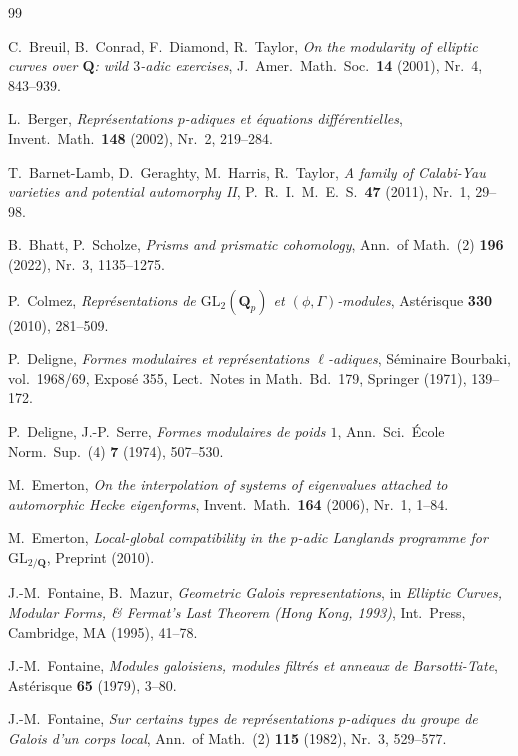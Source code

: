 \documentclass[12pt,a4paper]{amsart}
\theoremstyle{definition}
\theoremstyle{remark}
\begin{document}
\begin{thebibliography}{99}

C.\ Breuil, B.\ Conrad, F.\ Diamond, R.\ Taylor,
\textit{On the modularity of elliptic curves over $\mathbf{Q}$: wild $3$-adic exercises},
J.\ Amer.\ Math.\ Soc.\ \textbf{14} (2001), Nr.\ 4, 843--939.

L.\ Berger,
\textit{Représentations $p$-adiques et équations différentielles},
Invent.\ Math.\ \textbf{148} (2002), Nr.\ 2, 219--284.

T.\ Barnet-Lamb, D.\ Geraghty, M.\ Harris, R.\ Taylor,
\textit{A family of Calabi-Yau varieties and potential automorphy II},
P.\ R.\ I.\ M.\ E.\ S.\ \textbf{47} (2011), Nr.\ 1, 29--98.

B.\ Bhatt, P.\ Scholze,
\textit{Prisms and prismatic cohomology},
Ann.\ of Math.\ (2) \textbf{196} (2022), Nr.\ 3, 1135--1275.

P.\ Colmez,
\textit{Représentations de $\mathrm{GL}_2(\mathbf{Q}_p)$ et $(\phi, \Gamma)$-modules},
Astérisque \textbf{330} (2010), 281--509.

P.\ Deligne,
\textit{Formes modulaires et représentations $\ell$-adiques},
Séminaire Bourbaki, vol.\ 1968/69, Exposé 355, Lect.\ Notes in Math.\ Bd.\ 179,
Springer (1971), 139--172.

P.\ Deligne, J.-P.\ Serre,
\textit{Formes modulaires de poids $1$},
Ann.\ Sci.\ École Norm.\ Sup.\ (4) \textbf{7} (1974), 507--530.

M.\ Emerton,
\textit{On the interpolation of systems of eigenvalues attached to automorphic Hecke eigenforms},
Invent.\ Math.\ \textbf{164} (2006), Nr.\ 1, 1--84.

M.\ Emerton,
\textit{Local-global compatibility in the $p$-adic Langlands programme for $\mathrm{GL}_{2/\mathbf{Q}}$},
Preprint (2010).

J.-M.\ Fontaine, B.\ Mazur,
\textit{Geometric Galois representations},
in \textit{Elliptic Curves, Modular Forms, \& Fermat's Last Theorem (Hong Kong, 1993)},
Int.\ Press, Cambridge, MA (1995), 41--78.

J.-M.\ Fontaine,
\textit{Modules galoisiens, modules filtrés et anneaux de Barsotti-Tate},
Astérisque \textbf{65} (1979), 3--80.

J.-M.\ Fontaine,
\textit{Sur certains types de représentations $p$-adiques du groupe de Galois d'un corps local},
Ann.\ of Math.\ (2) \textbf{115} (1982), Nr.\ 3, 529--577.


\end{thebibliography}
\end{document}

